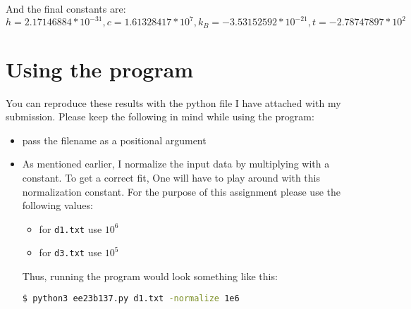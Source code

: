 \documentclass{report}
\begin{document}
\FloatBarrier
And the final constants are: \[ h=2.17146884*10^{-31}, c=1.61328417*10^7, k_B = -3.53152592*10^{-21},  t=-2.78747897*10^2 \]

\section*{Using the program}
You can reproduce these results with the python file I have attached with my submission. Please keep the following in mind while using the program:
\begin{itemize}
	\item pass the filename as a positional argument
	\item As mentioned earlier, I normalize the input data by multiplying with 
			a constant. To get a correct fit, One will have to play around with this normalization constant. For the purpose of this assignment please use the following values:
		\begin{itemize}
			\item for \texttt{d1.txt} use $10^6$
			\item for \texttt{d3.txt} use $10^5$
		\end{itemize}
Thus, running the program would look something like this: 
\begin{lstlisting}[language=bash]
	$ python3 ee23b137.py d1.txt -normalize 1e6
\end{lstlisting}
\end{itemize}
\end{document}
